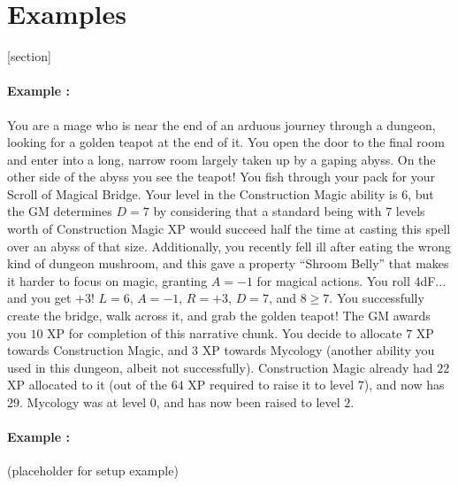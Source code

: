 \section{Examples}

[section]
\newenvironment{example}{\paragraph{Example \theexample:}}{}

\begin{example}
You are a mage who is near the end of an arduous journey through a dungeon, looking for a golden teapot at the end of it.
You open the door to the final room and enter into a long, narrow room largely taken up by a gaping abyss.
On the other side of the abyss you see the teapot!
You fish through your pack for your Scroll of Magical Bridge.
Your level in the Construction Magic ability is $6$,
but the GM determines
$D = 7$
by considering that a standard being with $7$ levels worth of Construction Magic XP would succeed half the time at casting this spell over an abyss of that size.
Additionally, you recently fell ill after eating the wrong kind of dungeon mushroom,
and this gave a property ``Shroom Belly'' that makes it harder to focus on magic,
granting $A = -1$ for magical actions.
You roll $4$dF... and you get $+3$!
$L = 6$, $A = -1$, $R = +3$, $D = 7$, and $8 \geq 7$.
You successfully create the bridge, walk across it, and grab the golden teapot!
The GM awards you $10$ XP for completion of this narrative chunk.
You decide to allocate $7$ XP towards Construction Magic, and $3$ XP towards Mycology (another ability you used in this dungeon, albeit not successfully).
Construction Magic already had $22$ XP allocated to it (out of the $64$ XP required to raise it to level $7$), and now has $29$.
Mycology was at level $0$, and has now been raised to level $2$.
\end{example}


\begin{example}
(placeholder for setup example)
\end{example}


